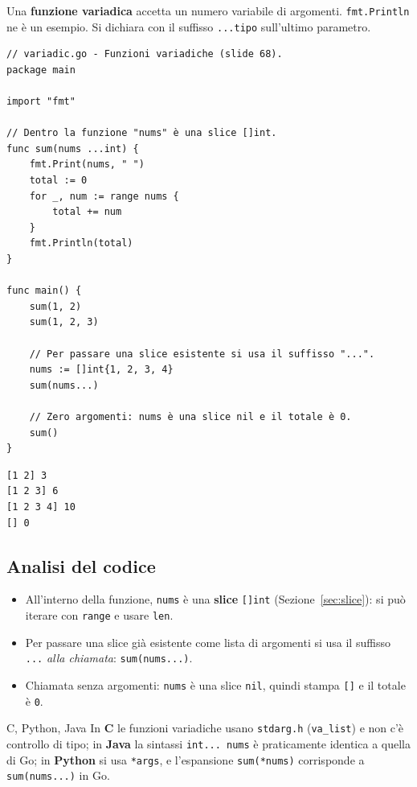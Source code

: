 \documentclass[11pt,a4paper]{report}
\newcommand{\cod}[1]{\texttt{#1}}
\begin{document}
Una \textbf{funzione variadica} accetta un numero variabile di argomenti.
\cod{fmt.Println} ne è un esempio. Si dichiara con il suffisso
\cod{...tipo} sull'ultimo parametro.

\begin{lstlisting}[style=gocode,caption={\texttt{02\_functions/variadic.go}}]
// variadic.go - Funzioni variadiche (slide 68).
package main

import "fmt"

// Dentro la funzione "nums" è una slice []int.
func sum(nums ...int) {
	fmt.Print(nums, " ")
	total := 0
	for _, num := range nums {
		total += num
	}
	fmt.Println(total)
}

func main() {
	sum(1, 2)
	sum(1, 2, 3)

	// Per passare una slice esistente si usa il suffisso "...".
	nums := []int{1, 2, 3, 4}
	sum(nums...)

	// Zero argomenti: nums è una slice nil e il totale è 0.
	sum()
}
\end{lstlisting}
\begin{lstlisting}[style=output]
[1 2] 3
[1 2 3] 6
[1 2 3 4] 10
[] 0
\end{lstlisting}

\subsection{Analisi del codice}

\begin{itemize}
  \item All'interno della funzione, \cod{nums} è una \textbf{slice} \cod{[]int}
        (Sezione~\ref{sec:slice}): si può iterare con \cod{range} e usare \cod{len}.
  \item Per passare una slice già esistente come lista di argomenti si usa il
        suffisso \cod{...} \emph{alla chiamata}: \cod{sum(nums...)}.
  \item Chiamata senza argomenti: \cod{nums} è una slice \cod{nil}, quindi
        stampa \cod{[]} e il totale è \cod{0}.
\end{itemize}

\begin{confronto}{C, Python, Java}
In \textbf{C} le funzioni variadiche usano \cod{stdarg.h} (\cod{va\_list}) e non
c'è controllo di tipo; in \textbf{Java} la sintassi \cod{int... nums} è
praticamente identica a quella di Go; in \textbf{Python} si usa \cod{*args}, e
l'espansione \cod{sum(*nums)} corrisponde a \cod{sum(nums...)} in Go.
\end{confronto}
\end{document}
